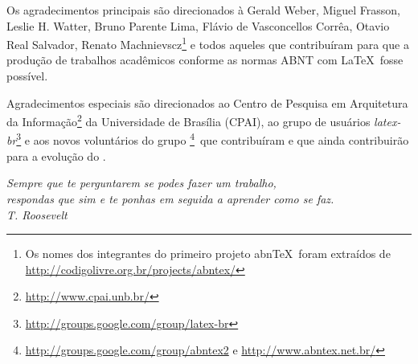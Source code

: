 \begin{agradecimentos}
Os agradecimentos principais são direcionados à Gerald Weber, Miguel Frasson,
Leslie H. Watter, Bruno Parente Lima, Flávio de Vasconcellos Corrêa, Otavio Real
Salvador, Renato Machnievscz\footnote{Os nomes dos integrantes do primeiro
projeto abn\TeX\ foram extraídos de
\url{http://codigolivre.org.br/projects/abntex/}} e todos aqueles que
contribuíram para que a produção de trabalhos acadêmicos conforme
as normas ABNT com \LaTeX\ fosse possível.

Agradecimentos especiais são direcionados ao Centro de Pesquisa em Arquitetura
da Informação\footnote{\url{http://www.cpai.unb.br/}} da Universidade de
Brasília (CPAI), ao grupo de usuários
\emph{latex-br}\footnote{\url{http://groups.google.com/group/latex-br}} e aos
novos voluntários do grupo
\emph{\abnTeX}\footnote{\url{http://groups.google.com/group/abntex2} e
\url{http://www.abntex.net.br/}}~que contribuíram e que ainda
contribuirão para a evolução do \abnTeX.

\end{agradecimentos}

\begin{epigrafe}
    \vspace*{\fill}
	\begin{flushright}
		\textit{Sempre que te perguntarem se podes fazer um trabalho,\\
		respondas que sim e te ponhas em seguida a aprender como se faz.\\
		T. Roosevelt}
	\end{flushright}
\end{epigrafe}



